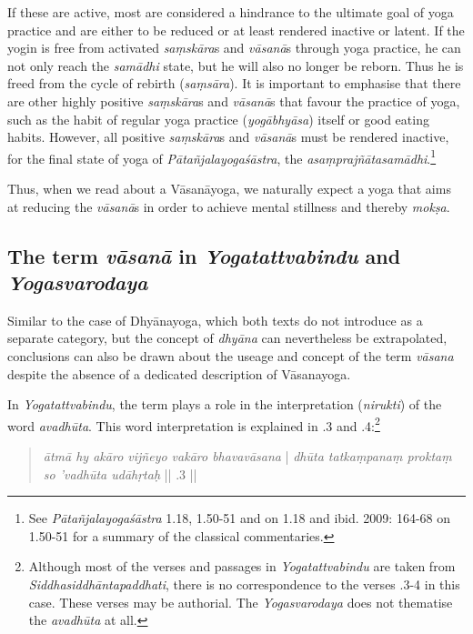 If these are active, most are considered a hindrance to the ultimate goal of yoga practice and are either to be reduced or at least rendered inactive or latent. If the yogin is free from activated \textit{saṃskāra}s and \textit{vāsanā}s through yoga practice, he can not only reach the \textit{samādhi} state, but he will also no longer be reborn. Thus he is freed from the cycle of rebirth (\textit{saṃsāra}). It is important to emphasise that there are other highly positive \textit{saṃskāra}s and \textit{vāsanā}s that favour the practice of yoga, such as the habit of regular yoga practice (\textit{yogābhyāsa}) itself or good eating habits. However, all positive \textit{saṃskāra}s and \textit{vāsanā}s must be rendered inactive, for the final state of yoga of \textit{Pātañjalayogaśāstra}, the \textit{asaṃprajñātasamādhi}.\footnote{See \textit{Pātañjalayogaśāstra} 1.18, 1.50-51 and \citeauthor[2009: 70-72]{bryant2009} on 1.18 and ibid. 2009: 164-68 on 1.50-51 for a summary of the classical commentaries.}  

Thus, when we read about a Vāsanāyoga, we naturally expect a yoga that aims at reducing the \textit{vāsanā}s in order to achieve mental stillness and thereby \textit{mokṣa}.

\subsection{The term \textit{vāsanā} in \textit{Yogatattvabindu} and \textit{Yogasvarodaya}}

Similar to the case of Dhyānayoga, which both texts do not introduce as a separate category, but the concept of \textit{dhyāna} can nevertheless be extrapolated, conclusions can also be drawn about the useage and concept of the term \textit{vāsana} despite the absence of a dedicated description of Vāsanayoga.

In \textit{Yogatattvabindu}, the term plays a role in the interpretation (\textit{nirukti}) of the word \textit{avadhūta}. This word interpretation is explained in .3 and .4:\footnote{Although most of the verses and passages in \textit{Yogatattvabindu}  are taken from \textit{Siddhasiddhāntapaddhati}, there is no correspondence to the verses .3-4 in this case. These verses may be authorial. The \textit{Yogasvarodaya} does not thematise the \textit{avadhūta} at all.}

\begin{quote}
  \textit{ātmā hy akāro vijñeyo vakāro bhavavāsana} |
  \textit{dhūta tatkaṃpanaṃ proktaṃ so 'vadhūta udāhṛtaḥ} || .3 ||
\end{quote}

